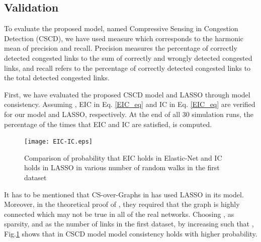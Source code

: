 \documentclass{article}
\begin{document}
\subsection{Validation}
\label{Validation}
To evaluate the proposed model, named Compressive Sensing in Congestion Detection (CSCD), we have used  measure which corresponds to the harmonic mean of precision and recall. Precision measures the percentage of correctly detected congested links to the sum of correctly and wrongly detected congested links, and recall refers to the percentage of correctly detected congested links to the total detected congested links. 

First, we have evaluated the proposed CSCD model and LASSO through model consistency. Assuming , EIC in Eq. \eqref{EIC_eq} and IC in Eq. \eqref{EIC_eq} are verified for our model and LASSO, respectively. At the end of all 30 simulation runs, the percentage of the times that EIC and IC are satisfied, is computed.
\begin{figure}[h]
\centering
\texttt{[image: EIC-IC.eps]}~ 
\caption{Comparison of probability that EIC holds in Elastic-Net and IC holds in LASSO in various number of random walks in the first dataset}
\label{ENet-LASSO}
\end{figure}
It has to be mentioned that CS-over-Graphs in \cite{CSoverGraph} has used LASSO in its model. Moreover, in the theoretical proof of \cite{CSoverGraph}, they required that the graph is highly connected which may not be true in all of the real networks. Choosing ,  as sparsity, and  as the number of links in the first dataset, by increasing  such that , Fig.\ref{ENet-LASSO} shows that in CSCD model model consistency holds with higher probability.
\end{document}
